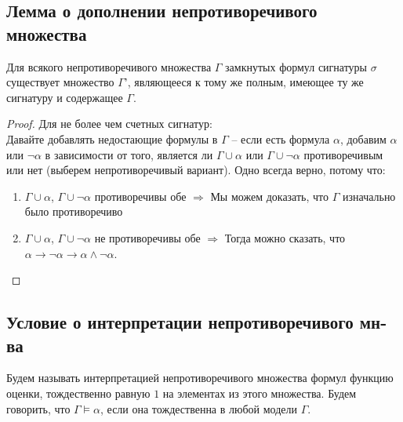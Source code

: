 \subsection{Лемма о дополнении непротиворечивого множества}
\label{sec-8-2}
\begin{lemma}
Для всякого непротиворечивого множества $\Gamma$ замкнутых формул сигнатуры $\sigma$ существует множество $\Gamma’$, являющееся к тому же полным, имеющее ту же сигнатуру и содержащее $\Gamma$.
\end{lemma}
\begin{proof}
Для не более чем счетных сигнатур:\\
Давайте добавлять недостающие формулы в $\Gamma$ -- если есть формула $\alpha$, добавим $\alpha$ или $\neg \alpha$ в зависимости от того, является ли $\Gamma \cup \alpha$ или $\Gamma \cup \neg \alpha$ противоречивым или нет (выберем непротиворечивый вариант). Одно всегда верно, потому что:
\begin{enumerate}
\item $\Gamma \cup \alpha$, $\Gamma \cup \neg \alpha$ противоречивы обе $\Rightarrow$ Мы можем доказать, что $\Gamma$ изначально было противоречиво
\item $\Gamma \cup \alpha$, $\Gamma \cup \neg \alpha$ не противоречивы обе $\Rightarrow$ Тогда можно сказать, что $\alpha \to \neg \alpha \to \alpha \land \neg \alpha$.
\end{enumerate}
\end{proof}
\subsection{Условие о интерпретации непротиворечивого мн-ва}
\label{sec-8-3}
Будем называть интерпретацией непротиворечивого множества формул функцию оценки, тождественно равную $1$ на элементах из этого множества. Будем говорить, что $\Gamma \vDash \alpha$, если она тождественна в любой модели $\Gamma$.
